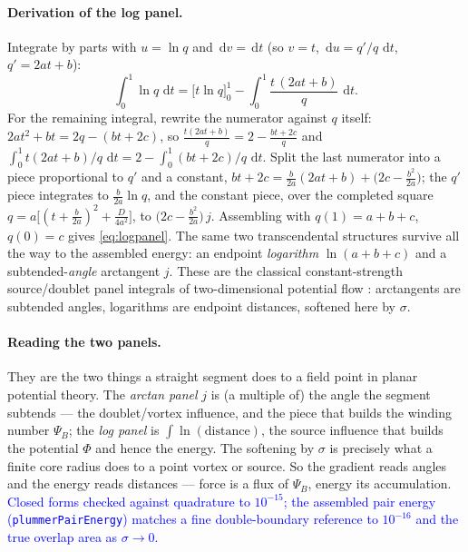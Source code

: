 \documentclass[11pt]{article}
\newcommand{\aside}[1]{\textcolor{blue}{#1}}
\newcommand{\dd}{\,\mathrm{d}}
\begin{document}
\paragraph{Derivation of the log panel.}  Integrate by parts with $u=\ln q$ and
$\dd v=\dd t$ (so $v=t$, $\dd u = q'/q\,\dd t$, $q'=2at+b$):
\[
  \int_0^1\ln q\,\dd t
  = \bigl[t\ln q\bigr]_0^1 - \int_0^1\frac{t\,(2at+b)}{q}\,\dd t .
\]
For the remaining integral, rewrite the numerator against $q$ itself:
$2at^2+bt = 2q-(bt+2c)$, so $\tfrac{t(2at+b)}{q}=2-\tfrac{bt+2c}{q}$ and
$\int_0^1 t(2at+b)/q\,\dd t = 2-\int_0^1(bt+2c)/q\,\dd t$.  Split the last numerator
into a piece proportional to $q'$ and a constant,
$bt+2c=\tfrac{b}{2a}(2at+b)+\bigl(2c-\tfrac{b^2}{2a}\bigr)$; the $q'$ piece integrates
to $\tfrac{b}{2a}\ln q$, and the constant piece, over the completed square
$q=a\bigl[(t+\tfrac{b}{2a})^2+\tfrac{D}{4a^2}\bigr]$, to
$\bigl(2c-\tfrac{b^2}{2a}\bigr)\,j$.  Assembling with $q(1)=a+b+c$, $q(0)=c$ gives
\eqref{eq:logpanel}.  The same two transcendental structures survive all the way to
the assembled energy: an endpoint \emph{logarithm} $\ln(a{+}b{+}c)$ and a
subtended-\emph{angle} arctangent $j$.  These are the classical constant-strength
source/doublet panel integrals of two-dimensional potential flow
\cite{HessSmith1967,KatzPlotkin2001}: arctangents are subtended angles, logarithms
are endpoint distances, softened here by $\sigma$.

\paragraph{Reading the two panels.}  They are the two things a straight segment does to
a field point in planar potential theory.  The \emph{arctan panel} $j$ is (a multiple
of) the angle the segment subtends --- the doublet/vortex influence, and the piece that
builds the winding number $\Psi_B$; the \emph{log panel} is $\int\ln(\text{distance})$,
the source influence that builds the potential $\Phi$ and hence the energy.  The
softening by $\sigma$ is precisely what a finite core radius does to a point vortex or
source.  So the gradient reads angles and the energy reads distances --- force is a flux
of $\Psi_B$, energy its accumulation.  \aside{Closed forms checked
against quadrature to $10^{-15}$; the assembled pair energy
(\texttt{plummerPairEnergy}) matches a fine double-boundary reference to $10^{-16}$
and the true overlap area as $\sigma\to0$.}
\end{document}
